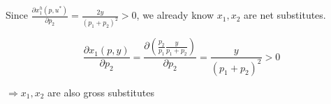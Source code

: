 \documentclass{article}
\begin{document}
Since $\frac{\partial x_1^h(p,u^*)}{\partial p_2} = \frac{2y}{(p_1 + p_2)^2}>0$, we already know $x_1, x_2$ are net substitutes.

$$\frac{\partial x_1(p,y)}{\partial p_2} = \frac{\partial (\frac{p_2}{p_1}\frac{y}{p_1 + p_2})}{\partial p_2} = \frac{y}{(p_1 + p_2)^2} > 0$$

$\Rightarrow x_1, x_2$ are also gross substitutes
\end{document}
